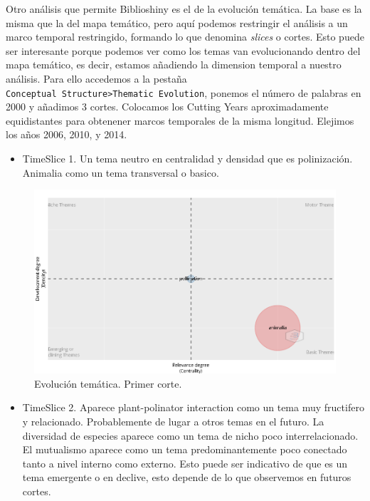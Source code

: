 \documentclass[
]{article}
\providecommand{\tightlist}{%
  \setlength{\itemsep}{0pt}\setlength{\parskip}{0pt}}
\begin{document}
Otro análisis que permite Biblioshiny es el de la evolución temática. La
base es la misma que la del mapa temático, pero aquí podemos restringir
el análisis a un marco temporal restringido, formando lo que denomina
\emph{slices} o cortes. Esto puede ser interesante porque podemos ver
como los temas van evolucionando dentro del mapa temático, es decir,
estamos añadiendo la dimension temporal a nuestro análisis. Para ello
accedemos a la pestaña
\texttt{Conceptual\ Structure\textgreater{}Thematic\ Evolution}, ponemos
el número de palabras en 2000 y añadimos 3 cortes. Colocamos los Cutting
Years aproximadamente equidistantes para obtenener marcos temporales de
la misma longitud. Elejimos los años 2006, 2010, y 2014.

\begin{itemize}
\tightlist
\item
  TimeSlice 1. Un tema neutro en centralidad y densidad que es
  polinización. Animalia como un tema transversal o basico.
\end{itemize}

\begin{figure}
\centering
\includegraphics{ThematicEvolutionSlice1.png}
\caption{Evolución temática. Primer corte.}
\end{figure}

\begin{itemize}
\tightlist
\item
  TimeSlice 2. Aparece plant-polinator interaction como un tema muy
  fructifero y relacionado. Probablemente de lugar a otros temas en el
  futuro. La diversidad de especies aparece como un tema de nicho poco
  interrelacionado. El mutualismo aparece como un tema predominantemente
  poco conectado tanto a nivel interno como externo. Esto puede ser
  indicativo de que es un tema emergente o en declive, esto depende de
  lo que observemos en futuros cortes.
\end{itemize}
\end{document}
